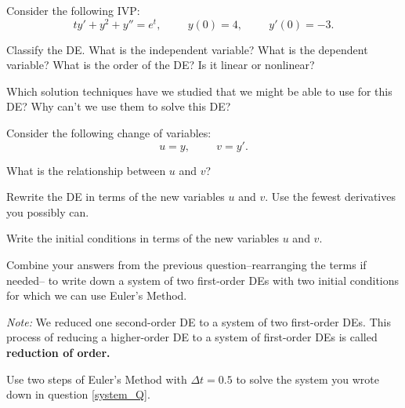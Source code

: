 \newpage
\ben[resume]
\item  Consider the following IVP:
 \[ ty' + y^2 + y''= e^t, \hspace{1cm} y(0) = 4, \hspace{1cm} y'(0) = -3. \]

 \ben
 \item  Classify the DE.  What is the independent variable?  What is the dependent
  variable?  What is the order of the DE?  Is it linear or nonlinear?\\ \vspace{1in}

 \item  Which solution techniques have we studied that we might be able to use for
  this DE?  Why can't we use them to solve this DE?\\ \vspace{1in}

 \item  Consider the following change of variables:
  \[ u = y, \hspace{1cm} v = y'. \]

  \ben
  \item  What is the relationship between $u$ and $v$?\\ \vspace{1in}

  \item  Rewrite the DE in terms of the new variables $u$ and $v.$
   Use the fewest derivatives you possibly can.\\ \vspace{1in}

  \item  Write the initial conditions in terms of the new variables $u$ and $v.$\\ \vspace{1in}
  \een
\newpage
 \item  Combine your answers from the previous question--rearranging the terms if needed--
  to write down a system of two first-order DEs with two initial conditions for which
  we can use Euler's Method.\\ \vspace{1in} \label{system_Q}

  {\it Note:} We reduced one second-order DE to a system of two first-order DEs.
  This process of reducing a higher-order DE to a system of first-order DEs is called
  {\bf reduction of order.}\\

 \item  Use two steps of Euler's Method with $\Delta t = 0.5$ to solve the system you
  wrote down in question \ref{system_Q}.\\ \vfill


